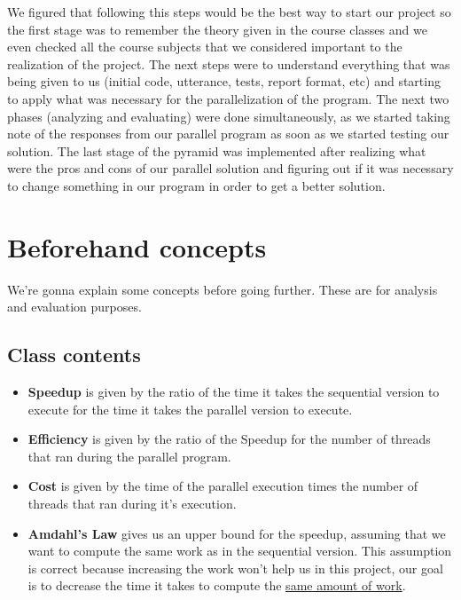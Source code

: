 \documentclass[10pt,journal,compsoc]{IEEEtran}
\begin{document}
We figured that following this steps would be the best way to start our project so the first stage was to remember the theory given in the course classes and we even checked all the course subjects that we considered important to the realization of the project. The next steps were to understand everything that was being given to us (initial code, utterance, tests, report format, etc) and starting to apply what was necessary for the parallelization of the program. The next two phases (analyzing and evaluating) were done simultaneously, as we started taking note of the responses from our parallel program as soon as we started testing our solution. The last stage of the pyramid was implemented after realizing what were the pros and cons of our parallel solution and figuring out if it was necessary to change something in our program in order to get a better solution.


\section{Beforehand concepts}
We're gonna explain some concepts before going further. These are for analysis and evaluation purposes.

\subsection{Class contents}
\begin{itemize}
    \item \textbf{Speedup} is given by the ratio of the time it takes the sequential version to execute for the time it takes the parallel version to execute.
    \item \textbf{Efficiency} is given by the ratio of the Speedup for the number of threads that ran during the parallel program.
    \item \textbf{Cost} is given by the time of the parallel execution times the number of threads that ran during it's execution.
    \item \textbf{Amdahl's Law} gives us an upper bound for the speedup, assuming that we want to compute the same work as in the sequential version. This assumption is correct because increasing the work won't help us in this project, our goal is to decrease the time it takes to compute the \underline{same amount of work}.
\end{itemize}
\end{document}
